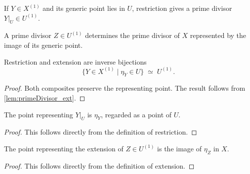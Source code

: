 \begin{definition}
  \label{def:primeDivisor_restrictToOpen}
  \leanok

  If \(Y\in X^{(1)}\) and its generic point lies in \(U\), restriction gives
  a prime divisor \(Y|_U\in U^{(1)}\).
\end{definition}

\begin{definition}
  \label{def:primeDivisor_ofOpen}
  \leanok

  A prime divisor \(Z\in U^{(1)}\) determines the prime divisor of \(X\)
  represented by the image of its generic point.
\end{definition}

\begin{lemma}
  \label{lem:primeDivisor_equivOpen}
  \leanok

  Restriction and extension are inverse bijections
  \[
    \{Y\in X^{(1)}\mid \eta_Y\in U\}\;\simeq\;U^{(1)}.
  \]
\end{lemma}
\begin{proof}
  \leanok
  Both composites preserve the representing point.  The result follows from
  \cref{lem:primeDivisor_ext}.
\end{proof}

\begin{lemma}
  \label{lem:primeDivisor_restrictToOpen_point}
  \leanok

  The point representing \(Y|_U\) is \(\eta_Y\), regarded as a point of \(U\).
\end{lemma}
\begin{proof}
  \leanok
  This follows directly from the definition of restriction.
\end{proof}

\begin{lemma}
  \label{lem:primeDivisor_ofOpen_point}
  \leanok

  The point representing the extension of \(Z\in U^{(1)}\) is the image of
  \(\eta_Z\) in \(X\).
\end{lemma}
\begin{proof}
  \leanok
  This follows directly from the definition of extension.
\end{proof}

